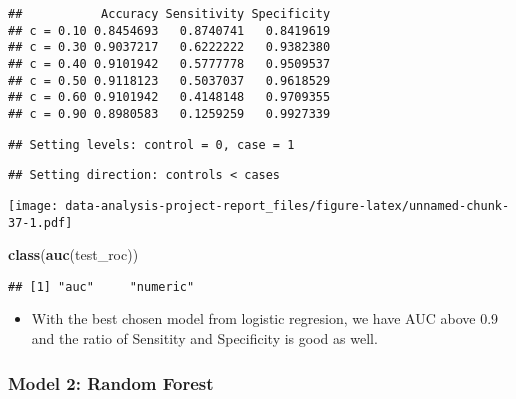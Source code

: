 \documentclass[
]{article}
\newenvironment{Shaded}{\begin{snugshade}}{\end{snugshade}}
\newcommand{\DataTypeTok}[1]{\textcolor[rgb]{0.13,0.29,0.53}{#1}}
\newcommand{\KeywordTok}[1]{\textcolor[rgb]{0.13,0.29,0.53}{\textbf{#1}}}
\newcommand{\NormalTok}[1]{#1}
\newcommand{\OperatorTok}[1]{\textcolor[rgb]{0.81,0.36,0.00}{\textbf{#1}}}
\newcommand{\OtherTok}[1]{\textcolor[rgb]{0.56,0.35,0.01}{#1}}
\newcommand{\StringTok}[1]{\textcolor[rgb]{0.31,0.60,0.02}{#1}}
\providecommand{\tightlist}{%
  \setlength{\itemsep}{0pt}\setlength{\parskip}{0pt}}
\begin{document}
\begin{verbatim}
##           Accuracy Sensitivity Specificity
## c = 0.10 0.8454693   0.8740741   0.8419619
## c = 0.30 0.9037217   0.6222222   0.9382380
## c = 0.40 0.9101942   0.5777778   0.9509537
## c = 0.50 0.9118123   0.5037037   0.9618529
## c = 0.60 0.9101942   0.4148148   0.9709355
## c = 0.90 0.8980583   0.1259259   0.9927339
\end{verbatim}

\begin{Shaded}
\end{Shaded}

\begin{verbatim}
## Setting levels: control = 0, case = 1
\end{verbatim}

\begin{verbatim}
## Setting direction: controls < cases
\end{verbatim}

\texttt{[image: data-analysis-project-report\_files/figure-latex/unnamed-chunk-37-1.pdf]}

\begin{Shaded}
\begin{Highlighting}[]
\KeywordTok{class}\NormalTok{(}\KeywordTok{auc}\NormalTok{(test_roc))}
\end{Highlighting}
\end{Shaded}

\begin{verbatim}
## [1] "auc"     "numeric"
\end{verbatim}

\begin{itemize}
\tightlist
\item
  With the best chosen model from logistic regresion, we have AUC above
  0.9 and the ratio of Sensitity and Specificity is good as well.
\end{itemize}

\hypertarget{model-2-random-forest}{%
\subsubsection{Model 2: Random Forest}\label{model-2-random-forest}}
\end{document}
